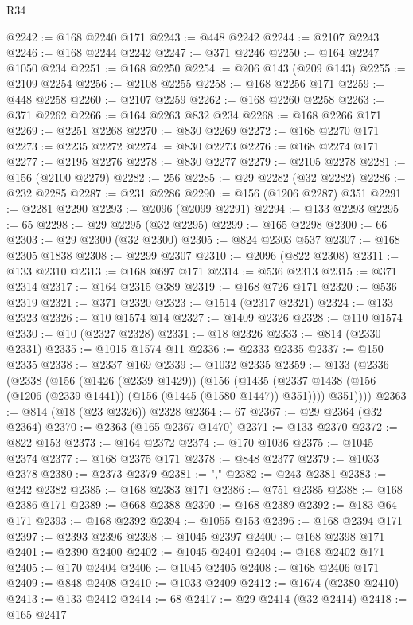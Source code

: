 \begin{lexlean}{R34}
\begin{coremodule}
@2242 := @168 @2240 @171
@2243 := @448 @2242
@2244 := @2107 @2243
@2246 := @168 @2244 @2242
@2247 := @371 @2246
@2250 := @164 @2247 @1050 @234
@2251 := @168 @2250
@2254 := @206 @143 (@209 @143)
@2255 := @2109 @2254
@2256 := @2108 @2255
@2258 := @168 @2256 @171
@2259 := @448 @2258
@2260 := @2107 @2259
@2262 := @168 @2260 @2258
@2263 := @371 @2262
@2266 := @164 @2263 @832 @234
@2268 := @168 @2266 @171
@2269 := @2251 @2268
@2270 := @830 @2269
@2272 := @168 @2270 @171
@2273 := @2235 @2272
@2274 := @830 @2273
@2276 := @168 @2274 @171
@2277 := @2195 @2276
@2278 := @830 @2277
@2279 := @2105 @2278
@2281 := @156 (@2100 @2279)
@2282 := 256
@2285 := @29 @2282 (@32 @2282)
@2286 := @232 @2285
@2287 := @231 @2286
@2290 := @156 (@1206 @2287) @351
@2291 := @2281 @2290
@2293 := @2096 (@2099 @2291)
@2294 := @133 @2293
@2295 := 65
@2298 := @29 @2295 (@32 @2295)
@2299 := @165 @2298
@2300 := 66
@2303 := @29 @2300 (@32 @2300)
@2305 := @824 @2303 @537
@2307 := @168 @2305 @1838
@2308 := @2299 @2307
@2310 := @2096 (@822 @2308)
@2311 := @133 @2310
@2313 := @168 @697 @171
@2314 := @536 @2313
@2315 := @371 @2314
@2317 := @164 @2315 @389
@2319 := @168 @726 @171
@2320 := @536 @2319
@2321 := @371 @2320
@2323 := @1514 (@2317 @2321)
@2324 := @133 @2323
@2326 := @10 @1574 @14
@2327 := @1409 @2326
@2328 := @110 @1574
@2330 := @10 (@2327 @2328)
@2331 := @18 @2326
@2333 := @814 (@2330 @2331)
@2335 := @1015 @1574 @11
@2336 := @2333 @2335
@2337 := @150 @2335
@2338 := @2337 @169
@2339 := @1032 @2335
@2359 := @133
    (@2336
      (@2338
        (@156
          (@1426 (@2339 @1429))
          (@156
            (@1435 (@2337 @1438 (@156 (@1206 (@2339 @1441)) (@156 (@1445 (@1580 @1447)) @351))))
            @351))))
@2363 := @814 (@18 (@23 @2326)) @2328
@2364 := 67
@2367 := @29 @2364 (@32 @2364)
@2370 := @2363 (@165 @2367 @1470)
@2371 := @133 @2370
@2372 := @822 @153
@2373 := @164 @2372
@2374 := @170 @1036
@2375 := @1045 @2374
@2377 := @168 @2375 @171
@2378 := @848 @2377
@2379 := @1033 @2378
@2380 := @2373 @2379
@2381 := ","
@2382 := @243 @2381
@2383 := @242 @2382
@2385 := @168 @2383 @171
@2386 := @751 @2385
@2388 := @168 @2386 @171
@2389 := @668 @2388
@2390 := @168 @2389
@2392 := @183 @64 @171
@2393 := @168 @2392
@2394 := @1055 @153
@2396 := @168 @2394 @171
@2397 := @2393 @2396
@2398 := @1045 @2397
@2400 := @168 @2398 @171
@2401 := @2390 @2400
@2402 := @1045 @2401
@2404 := @168 @2402 @171
@2405 := @170 @2404
@2406 := @1045 @2405
@2408 := @168 @2406 @171
@2409 := @848 @2408
@2410 := @1033 @2409
@2412 := @1674 (@2380 @2410)
@2413 := @133 @2412
@2414 := 68
@2417 := @29 @2414 (@32 @2414)
@2418 := @165 @2417

\end{coremodule}
\end{lexlean}
